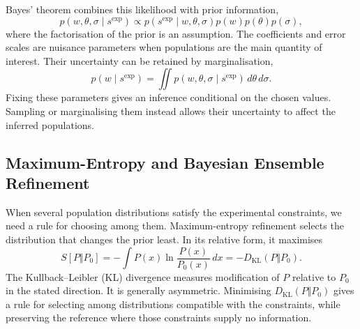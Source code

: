 Bayes' theorem combines this likelihood with prior information,
\begin{equation}
    p(w,\theta,\sigma\mid s^{\text{exp}})
    \propto p(s^{\text{exp}}\mid w,\theta,\sigma)
    p(w)p(\theta)p(\sigma),
    \label{eq:bg-bayesian-posterior}
\end{equation}
where the factorisation of the prior is an assumption. The coefficients and error scales are nuisance parameters when populations are the main quantity of interest. Their uncertainty can be retained by marginalisation,
\begin{equation}
    p(w\mid s^{\text{exp}})=
    \iint p(w,\theta,\sigma\mid s^{\text{exp}})\,d\theta\,d\sigma.
    \label{eq:bg-marginalisation}
\end{equation}
Fixing these parameters gives an inference conditional on the chosen values. Sampling or marginalising them instead allows their uncertainty to affect the inferred populations.\supercite{bmsb2012ch1,bmsb2012ch12}

\subsection{Maximum-Entropy and Bayesian Ensemble Refinement}
\label{sec:bg-maxent}

When several population distributions satisfy the experimental constraints, we need a rule for choosing among them. Maximum-entropy refinement selects the distribution that changes the prior least. In its relative form, it maximises
\begin{equation}
    S[P\Vert P_0]
    =-\int P(x)\ln\frac{P(x)}{P_0(x)}\,dx
    =-D_{\text{KL}}(P\Vert P_0).
    \label{eq:bg-relative-entropy}
\end{equation}
The Kullback--Leibler (KL) divergence measures modification of $P$ relative to $P_0$ in the stated direction. It is generally asymmetric. Minimising $D_{\text{KL}}(P\Vert P_0)$ gives a rule for selecting among distributions compatible with the constraints, while preserving the reference where those constraints supply no information.\supercite{bmsb2012ch1,cesariUsingMaximumEntropy2018}

